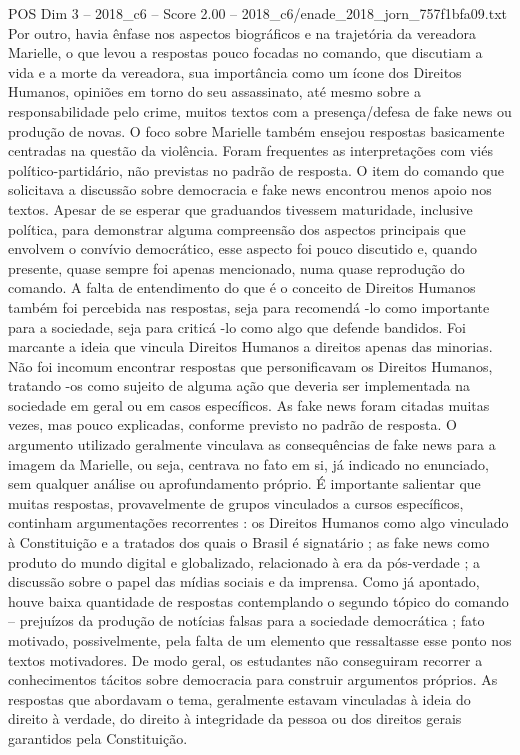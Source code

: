 \begin{textsample}{POS Dim 3 – 2018\_c6 – Score 2.00 – 2018\_c6/enade\_2018\_jorn\_757f1bfa09.txt}
Por outro, havia ênfase nos aspectos biográficos e na trajetória da vereadora Marielle, o que levou a respostas pouco focadas no comando, que discutiam a vida e a morte da vereadora, sua importância como um ícone dos Direitos Humanos, opiniões em torno do seu assassinato, até mesmo sobre a responsabilidade pelo crime, muitos textos com a presença/defesa de fake news ou produção de novas.
O foco sobre Marielle também ensejou respostas basicamente centradas na questão da violência.
Foram frequentes as interpretações com viés político-partidário, não previstas no padrão de resposta.
O item do comando que solicitava a discussão sobre democracia e fake news encontrou menos apoio nos textos.
Apesar de se esperar que graduandos tivessem maturidade, inclusive política, para demonstrar alguma compreensão dos aspectos principais que envolvem o convívio democrático, esse aspecto foi pouco discutido e, quando presente, quase sempre foi apenas mencionado, numa quase reprodução do comando.
A falta de entendimento do que é o conceito de Direitos Humanos também foi percebida nas respostas, seja para recomendá -lo como importante para a sociedade, seja para criticá -lo como algo que defende bandidos.
Foi marcante a ideia que vincula Direitos Humanos a direitos apenas das minorias.
Não foi incomum encontrar respostas que personificavam os Direitos Humanos, tratando -os como sujeito de alguma ação que deveria ser implementada na sociedade em geral ou em casos específicos.
As fake news foram citadas muitas vezes, mas pouco explicadas, conforme previsto no padrão de resposta.
O argumento utilizado geralmente vinculava as consequências de fake news para a imagem da Marielle, ou seja, centrava no fato em si, já indicado no enunciado, sem qualquer análise ou aprofundamento próprio.
É importante salientar que muitas respostas, provavelmente de grupos vinculados a cursos específicos, continham argumentações recorrentes : os Direitos Humanos como algo vinculado à Constituição e a tratados dos quais o Brasil é signatário ; as fake news como produto do mundo digital e globalizado, relacionado à era da pós-verdade ; a discussão sobre o papel das mídias sociais e da imprensa.
Como já apontado, houve baixa quantidade de respostas contemplando o segundo tópico do comando – prejuízos da produção de notícias falsas para a sociedade democrática ; fato motivado, possivelmente, pela falta de um elemento que ressaltasse esse ponto nos textos motivadores.
De modo geral, os estudantes não conseguiram recorrer a conhecimentos tácitos sobre democracia para construir argumentos próprios.
As respostas que abordavam o tema, geralmente estavam vinculadas à ideia do direito à verdade, do direito à integridade da pessoa ou dos direitos gerais garantidos pela Constituição.

\end{textsample}
